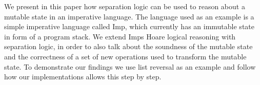 We present in this paper how separation logic can be used to reason about a mutable state in an imperative language. The language used as an example is a simple imperative language called Imp, which currently has an immutable state in form of a program stack. We extend Imps Hoare logical reasoning with separation logic, in order to also talk about the soundness of the mutable state and the correctness of a set of new operations used to transform the mutable state. To demonstrate our findings we use list reversal as an example and follow how our implementations allows this step by step.